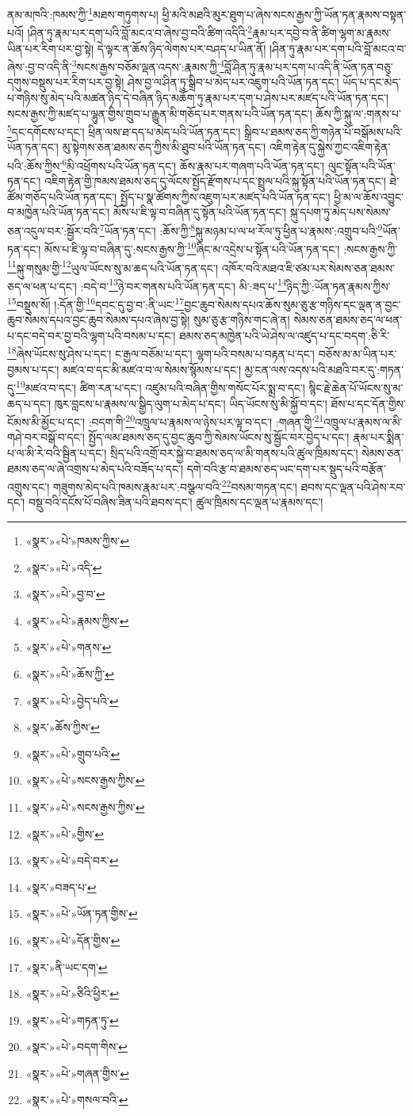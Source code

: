 ནམ་མཁའི་:ཁམས་ཀྱི་\footnote{«སྣར་»«པེ་»ཁམས་ཀྱིས་}མཐས་གཏུགས་པ། ཕྱི་མའི་མཐའི་མུར་ཐུག་པ་ཞེས་སངས་རྒྱས་ཀྱི་ཡོན་ཏན་རྣམས་བསྟན་པའོ། །ཤིན་ཏུ་རྣམ་པར་དག་པའི་བློ་མངའ་བ་ཞེས་བྱ་བའི་ཚིག་འདིའི་\footnote{«སྣར་»«པེ་»འདི་}རྣམ་པར་དབྱེ་བ་ནི་ཚིག་ལྷག་མ་རྣམས་ཡིན་པར་རིག་པར་བྱ་སྟེ། དེ་ལྟར་ན་ཆོས་ཉིད་ལེགས་པར་བཤད་པ་ཡིན་ནོ། །ཤིན་ཏུ་རྣམ་པར་དག་པའི་བློ་མངའ་བ་ཞེས་:བྱ་བ་འདི་ནི་\footnote{«སྣར་»«པེ་»བྱ་བ་}སངས་རྒྱས་བཅོམ་ལྡན་འདས་:རྣམས་ཀྱི་\footnote{«སྣར་»«པེ་»རྣམས་ཀྱིས་}བློ་ཤིན་ཏུ་རྣམ་པར་དག་པ་འདི་ནི་ཡོན་ཏན་བཅུ་དགུས་བསྡུས་པར་རིག་པར་བྱ་སྟེ། ཤེས་བྱ་ལ་ཤིན་ཏུ་སྒྲིབ་པ་མེད་པར་འཇུག་པའི་ཡོན་ཏན་དང་། ཡོད་པ་དང་མེད་པ་གཉིས་སུ་མེད་པའི་མཚན་ཉིད་དེ་བཞིན་ཉིད་མཆོག་ཏུ་རྣམ་པར་དག་པ་ཤེས་པར་མཛད་པའི་ཡོན་ཏན་དང་། སངས་རྒྱས་ཀྱི་མཛད་པ་ལྷུན་གྱིས་གྲུབ་པ་རྒྱུན་མི་གཅོད་པར་གནས་པའི་ཡོན་ཏན་དང་། ཆོས་ཀྱི་སྐུ་ལ་:གནས་པ་\footnote{«སྣར་»«པེ་»གནས་}དང་དགོངས་པ་དང་། ཕྲིན་ལས་ཐ་དད་པ་མེད་པའི་ཡོན་ཏན་དང་། སྒྲིབ་པ་ཐམས་ཅད་ཀྱི་གཉེན་པོ་བསྒོམས་པའི་ཡོན་ཏན་དང་། མུ་སྟེགས་ཅན་ཐམས་ཅད་ཀྱིས་མི་ཐུབ་པའི་ཡོན་ཏན་དང་། འཇིག་རྟེན་དུ་སྐྱེས་ཀྱང་འཇིག་རྟེན་པའི་:ཆོས་ཀྱིས་\footnote{«སྣར་»«པེ་»ཆོས་ཀྱི་}མི་འཕྲོགས་པའི་ཡོན་ཏན་དང་། ཆོས་རྣམ་པར་གཞག་པའི་ཡོན་ཏན་དང་། ལུང་སྟོན་པའི་ཡོན་ཏན་དང་། འཇིག་རྟེན་གྱི་ཁམས་ཐམས་ཅད་དུ་ལོངས་སྤྱོད་རྫོགས་པ་དང་སྤྲུལ་པའི་སྐུ་སྟོན་པའི་ཡོན་ཏན་དང་། ཐེ་ཚོམ་གཅོད་པའི་ཡོན་ཏན་དང་། སྤྱོད་པ་སྣ་ཚོགས་ཀྱིས་འཇུག་པར་མཛད་པའི་ཡོན་ཏན་དང་། ཕྱི་མ་ལ་ཆོས་འབྱུང་བ་མཁྱེན་པའི་ཡོན་ཏན་དང་། མོས་པ་ཇི་ལྟ་བ་བཞིན་དུ་སྟོན་པའི་ཡོན་ཏན་དང་། སྐུ་དཔག་ཏུ་མེད་པས་སེམས་ཅན་འདུལ་བར་:སྦྱོར་བའི་\footnote{«སྣར་»«པེ་»བྱེད་པའི་}ཡོན་ཏན་དང་། :ཆོས་ཀྱི་\footnote{«སྣར་»ཆོས་ཀྱིས་}སྐུ་མཉམ་པ་ལ་ཕ་རོལ་ཏུ་ཕྱིན་པ་རྣམས་:འགྲུབ་པའི་\footnote{«སྣར་»«པེ་»གྲུབ་པའི་}ཡོན་ཏན་དང་། མོས་པ་ཇི་ལྟ་བ་བཞིན་དུ་:སངས་རྒྱས་ཀྱི་\footnote{«སྣར་»«པེ་»སངས་རྒྱས་ཀྱིས་}ཞིང་མ་འདྲེས་པ་སྟོན་པའི་ཡོན་ཏན་དང་། :སངས་རྒྱས་ཀྱི་\footnote{«སྣར་»«པེ་»སངས་རྒྱས་ཀྱིས་}སྐུ་གསུམ་གྱི་\footnote{«སྣར་»«པེ་»གྱིས་}ཡུལ་ཡོངས་སུ་མ་ཆད་པའི་ཡོན་ཏན་དང་། འཁོར་བའི་མཐའ་ཇི་ཙམ་པར་སེམས་ཅན་ཐམས་ཅད་ལ་ཕན་པ་དང་། :བདེ་བ་\footnote{«སྣར་»«པེ་»བདེ་བར་}ཉེ་བར་གནས་པའི་ཡོན་ཏན་དང་། མི་:ཟད་པ་\footnote{«སྣར་»བཟད་པ་}ཉིད་ཀྱི་:ཡོན་ཏན་རྣམས་ཀྱིས་\footnote{«སྣར་»«པེ་»ཡོན་ཏན་གྱིས་}བསྡུས་སོ། །:དོན་གྱི་\footnote{«སྣར་»«པེ་»དོན་གྱིས་}དབང་དུ་བྱ་བ་:ནི་ཡང་\footnote{«སྣར་»ནི་ཡང་དག་}བྱང་ཆུབ་སེམས་དཔའ་ཆོས་སུམ་ཅུ་རྩ་གཉིས་དང་ལྡན་ན་བྱང་ཆུབ་སེམས་དཔའ་བྱང་ཆུབ་སེམས་དཔའ་ཞེས་བྱ་སྟེ། སུམ་ཅུ་རྩ་གཉིས་གང་ཞེ་ན། སེམས་ཅན་ཐམས་ཅད་ལ་ཕན་པ་དང་བདེ་བར་བྱ་བའི་ལྷག་པའི་བསམ་པ་དང་། ཐམས་ཅད་མཁྱེན་པའི་ཡེ་ཤེས་ལ་འཛུད་པ་དང་བདག་:ཅི་རི་\footnote{«སྣར་»«པེ་»ཅིའི་ཕྱིར་}ཞེས་ཡོངས་སུ་ཤེས་པ་དང་། ང་རྒྱལ་བཅོམ་པ་དང་། ལྷག་པའི་བསམ་པ་བརྟན་པ་དང་། བཅོས་མ་མ་ཡིན་པར་བྱམས་པ་དང་། མཛའ་བ་དང་མི་མཛའ་བ་ལ་སེམས་སྙོམས་པ་དང་། མྱ་ངན་ལས་འདས་པའི་མཐའི་བར་དུ་:གཏན་དུ་\footnote{«སྣར་»«པེ་»གཏན་ཏུ་}མཛའ་བ་དང་། ཚིག་རན་པ་དང་། འཛུམ་པའི་བཞིན་གྱིས་གསོང་པོར་སྨྲ་བ་དང་། སྙིང་རྗེ་ཆེན་པོ་ཡོངས་སུ་མ་ཆད་པ་དང་། ཁུར་བླངས་པ་རྣམས་ལ་སྒྱིད་ལུག་པ་མེད་པ་དང་། ཡིད་ཡོངས་སུ་མི་སྐྱོ་བ་དང་། ཐོས་པ་དང་དོན་གྱིས་ངོམས་མི་མྱོང་པ་དང་། :བདག་གི་\footnote{«སྣར་»«པེ་»བདག་གིས་}འཁྲུལ་པ་རྣམས་ལ་ཉེས་པར་ལྟ་བ་དང་། :གཞན་གྱི་\footnote{«སྣར་»«པེ་»གཞན་གྱིས་}འཁྲུལ་པ་རྣམས་ལ་མི་གཤེ་བར་བསྒོ་བ་དང་། སྤྱོད་ལམ་ཐམས་ཅད་དུ་བྱང་ཆུབ་ཀྱི་སེམས་ཡོངས་སུ་སྦྱོང་བར་བྱེད་པ་དང་། རྣམ་པར་སྨིན་པ་ལ་མི་རེ་བའི་སྦྱིན་པ་དང་། སྲིད་པའི་འགྲོ་བར་སྐྱེ་བ་ཐམས་ཅད་ལ་མི་གནས་པའི་ཚུལ་ཁྲིམས་དང་། སེམས་ཅན་ཐམས་ཅད་ལ་ཞེ་འགྲས་པ་མེད་པའི་བཟོད་པ་དང་། དགེ་བའི་རྩ་བ་ཐམས་ཅད་ཡང་དག་པར་སྡུད་པའི་བརྩོན་འགྲུས་དང་། གཟུགས་མེད་པའི་ཁམས་རྣམ་པར་:བསྩལ་བའི་\footnote{«སྣར་»«པེ་»གསལ་བའི་}བསམ་གཏན་དང་། ཐབས་དང་ལྡན་པའི་ཤེས་རབ་དང་། བསྡུ་བའི་དངོས་པོ་བཞིས་ཟིན་པའི་ཐབས་དང་། ཚུལ་ཁྲིམས་དང་ལྡན་པ་རྣམས་དང་། 